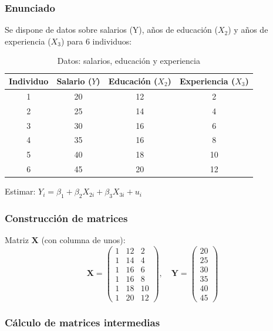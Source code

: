 \documentclass[11pt,a4paper]{article}
\begin{document}
\subsubsection*{Enunciado}
 
Se dispone de datos sobre salarios (Y), años de educación ($X_2$) y años de experiencia ($X_3$) para 6 individuos:
 
\begin{table}[H]
\centering
\small
\begin{tabular}{|c|c|c|c|}
\hline
Individuo & Salario ($Y$) & Educación ($X_2$) & Experiencia ($X_3$) \\
\hline
1 & 20 & 12 & 2 \\
2 & 25 & 14 & 4 \\
3 & 30 & 16 & 6 \\
4 & 35 & 16 & 8 \\
5 & 40 & 18 & 10 \\
6 & 45 & 20 & 12 \\
\hline
\end{tabular}
\caption{Datos: salarios, educación y experiencia}
\label{tab:datos_salarios}
\end{table}
 
Estimar: $Y_i = \beta_1 + \beta_2 X_{2i} + \beta_3 X_{3i} + u_i$
 
\subsubsection*{Construcción de matrices}
 
Matriz $\mathbf{X}$ (con columna de unos):
\[
\mathbf{X} = \begin{pmatrix}
1 & 12 & 2 \\
1 & 14 & 4 \\
1 & 16 & 6 \\
1 & 16 & 8 \\
1 & 18 & 10 \\
1 & 20 & 12
\end{pmatrix}, \quad
\mathbf{Y} = \begin{pmatrix} 20 \\ 25 \\ 30 \\ 35 \\ 40 \\ 45 \end{pmatrix}
\]
 
\subsubsection*{Cálculo de matrices intermedias}
 
\end{document}
